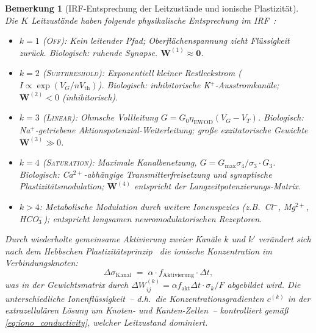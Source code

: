 \documentclass[12pt, a4paper, openany]{report}
\newtheorem{remark}[theorem]{Bemerkung}
\begin{document}
\begin{remark}[IRF-Entsprechung der Leitzustände und ionische Plastizität]
\label{rem:ionic_biology}
Die $K$ Leitzustände haben folgende physikalische Entsprechung im
IRF~\cite{epp2026iono}:
\begin{itemize}
  \item $k=1$ (\textsc{Off}): Kein leitender Pfad; Oberflächenspannung
    zieht Flüssigkeit zurück.  Biologisch: ruhende Synapse.
    $\bm{W}^{(1)} \approx \bm{0}$.
  \item $k=2$ (\textsc{Subthreshold}): Exponentiell kleiner Restleckstrom
    ($I \propto \exp(V_G / n V_\mathrm{th})$).  Biologisch: inhibitorische
    K$^+$-Ausstromkanäle; $\bm{W}^{(2)} < 0$ (inhibitorisch).
  \item $k=3$ (\textsc{Linear}): Ohmsche Vollleitung $G = G_0\eta_{\mathrm{EWOD}}
    (V_G - V_T)$.  Biologisch: Na$^+$-getriebene Aktionspotenzial-Weiterleitung;
    große exzitatorische Gewichte $\bm{W}^{(3)} \gg 0$.
  \item $k=4$ (\textsc{Saturation}): Maximale Kanalbenetzung, $G = G_{\max}
    \sigma_4 / \sigma_3 \cdot G_3$.  Biologisch: Ca$^{2+}$-abhängige
    Transmitterfreisetzung und synaptische Plastizitätsmodulation;
    $\bm{W}^{(4)}$ entspricht der Langzeitpotenzierungs-Matrix.
  \item $k > 4$: Metabolische Modulation durch weitere Ionenspezies
    (z.B.\ Cl$^-$, Mg$^{2+}$, HCO$_3^-$); entspricht langsamen
    neuro\-modulatorischen Rezeptoren.
\end{itemize}
Durch wiederholte gemeinsame Aktivierung zweier Kanäle $k$ und $k'$
verändert sich nach dem Hebbschen Plastizitätsprinzip~\cite{epp2026iono}
die ionische Konzentration im Verbindungsknoten:
\begin{equation}
  \label{eq:ionic_plasticity}
  \Delta\sigma_{\mathrm{Kanal}} \;=\; \alpha \cdot f_{\mathrm{Aktivierung}} \cdot \Delta t,
\end{equation}
was in der Gewichtsmatrix durch
$\Delta W^{(k)}_{ij} = \alpha f_{\mathrm{akt}} \Delta t \cdot \sigma_k / F$
abgebildet wird.
Die unterschiedliche Ionenflüssigkeit~-- d.h.\ die Konzentrationsgradienten
$c^{(k)}$ in der extrazellulären Lösung um Knoten- und Kanten-Zellen~--
kontrolliert gemäß \eqref{eq:iono_conductivity}, welcher Leitzustand dominiert.
\end{remark}
\end{document}
